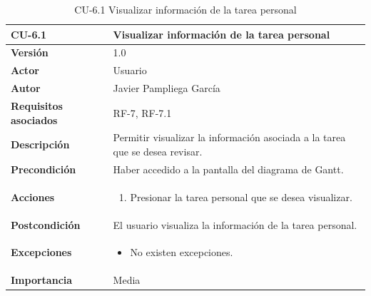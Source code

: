 \begin{table}[p]
	\centering
	\begin{tabularx}{\linewidth}{ p{} p{} }
		\toprule
		\textbf{CU-6.1}    & \textbf{Visualizar información de la tarea personal}\\
		\toprule
		\textbf{Versión}              & 1.0    \\
            \textbf{Actor}                & Usuario \\
		\textbf{Autor}                & Javier Pampliega García \\
		\textbf{Requisitos asociados} & RF-7, RF-7.1\\
		\textbf{Descripción}          & Permitir visualizar la información asociada a la tarea que se desea revisar. \\
		\textbf{Precondición}         & Haber accedido a la pantalla del diagrama de Gantt. \\
		\textbf{Acciones}             &
		\begin{enumerate}
			\def\labelenumi{\arabic{enumi}.}
			\tightlist
			\item Presionar la tarea personal que se desea visualizar.
		\end{enumerate}\\
		\textbf{Postcondición}        & El usuario visualiza la información de la tarea personal. \\
		\textbf{Excepciones}          & \begin{itemize}
		    \item No existen excepciones.
		\end{itemize} \\
		\textbf{Importancia}          & Media \\
		\bottomrule
	\end{tabularx}
	\caption{CU-6.1 Visualizar información de la tarea personal}
\end{table}

